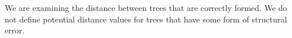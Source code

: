 We are examining the distance between trees that are correctly formed. We do not define potential distance values for trees that have some form of structural error.








